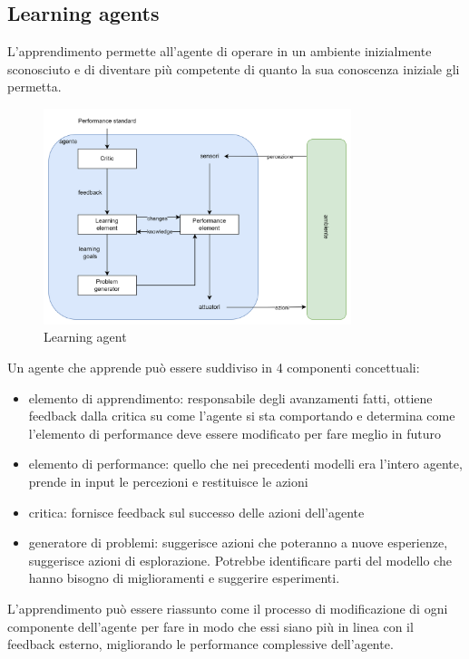 \subsection{Learning agents}

L’apprendimento permette all’agente di operare in un ambiente inizialmente sconosciuto e di diventare più competente di quanto la sua conoscenza iniziale gli permetta.

\begin{figure}[H]
	\centering
	\includegraphics[width=0.8\textwidth]{capitoli/agenti-intelligenti/imgs/learning.png}
	\caption{Learning agent}
	\label{fig:immagine6}
\end{figure}

Un agente che apprende può essere suddiviso in 4 componenti concettuali:

\begin{itemize}
	\item elemento di apprendimento: responsabile degli avanzamenti fatti, ottiene feedback dalla critica su come l’agente si sta comportando e determina come l’elemento di performance deve essere modificato per fare meglio in futuro
	\item elemento di performance: quello che nei precedenti modelli era l’intero agente, prende in input le percezioni e restituisce le azioni
	\item critica: fornisce feedback sul successo delle azioni dell’agente
	\item generatore di problemi: suggerisce azioni che poteranno a nuove esperienze, suggerisce azioni di esplorazione. Potrebbe identificare parti del modello che hanno bisogno di miglioramenti e suggerire esperimenti.
\end{itemize}

L’apprendimento può essere riassunto come il processo di modificazione di ogni componente dell’agente per fare in modo che essi siano più in linea con il feedback esterno, migliorando le performance complessive dell’agente.

